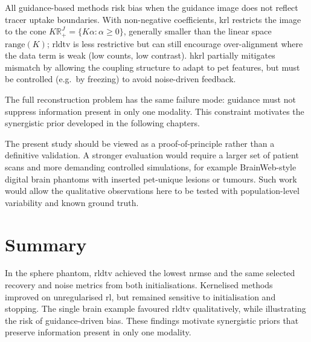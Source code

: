 All guidance-based methods risk bias when the guidance image does not reflect tracer uptake boundaries. With non-negative coefficients, \gls{krl} restricts the image to the cone $K\mathbb{R}_+^J=\{K\alpha:\alpha\ge0\}$, generally smaller than the linear space $\mathrm{range}(K)$; \gls{rldtv} is less restrictive but can still encourage over-alignment where the data term is weak (low counts, low contrast). \gls{hkrl} partially mitigates mismatch by allowing the coupling structure to adapt to \gls{pet} features, but must be controlled (e.g.\ by freezing) to avoid noise-driven feedback.

The full reconstruction problem has the same failure mode: guidance must not suppress information present in only one modality. This constraint motivates the synergistic prior developed in the following chapters.

The present study should be viewed as a proof-of-principle rather than a definitive validation. A stronger evaluation would require a larger set of patient scans and more demanding controlled simulations, for example BrainWeb-style digital brain phantoms with inserted \gls{pet}-unique lesions or tumours. Such work would allow the qualitative observations here to be tested with population-level variability and known ground truth.

\section{Summary}
\label{sec:deconv_summary}

In the sphere phantom, \gls{rldtv} achieved the lowest \gls{nrmse} and the same selected recovery and noise metrics from both initialisations. Kernelised methods improved on unregularised \gls{rl}, but remained sensitive to initialisation and stopping. The single brain example favoured \gls{rldtv} qualitatively, while illustrating the risk of guidance-driven bias. These findings motivate synergistic priors that preserve information present in only one modality.

